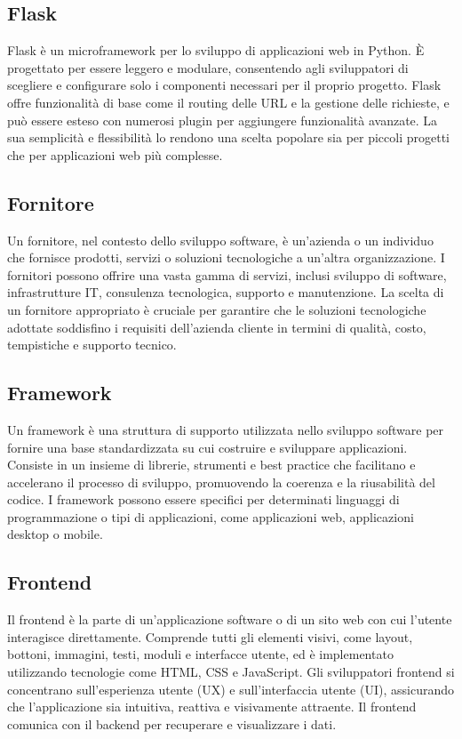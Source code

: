 \vspace{2em}
\subsection*{Flask}
Flask è un microframework per lo sviluppo di applicazioni web in Python. È progettato per essere leggero e modulare, consentendo agli sviluppatori di scegliere e configurare solo i componenti necessari per il proprio progetto. Flask offre funzionalità di base come il routing delle URL e la gestione delle richieste, e può essere esteso con numerosi plugin per aggiungere funzionalità avanzate. La sua semplicità e flessibilità lo rendono una scelta popolare sia per piccoli progetti che per applicazioni web più complesse.

\vspace{2em}
\subsection*{Fornitore}
Un fornitore, nel contesto dello sviluppo software, è un'azienda o un individuo che fornisce prodotti, servizi o soluzioni tecnologiche a un'altra organizzazione. I fornitori possono offrire una vasta gamma di servizi, inclusi sviluppo di software, infrastrutture IT, consulenza tecnologica, supporto e manutenzione. La scelta di un fornitore appropriato è cruciale per garantire che le soluzioni tecnologiche adottate soddisfino i requisiti dell'azienda cliente in termini di qualità, costo, tempistiche e supporto tecnico.

\vspace{2em}
\subsection*{Framework}
Un framework è una struttura di supporto utilizzata nello sviluppo software per fornire una base standardizzata su cui costruire e sviluppare applicazioni. Consiste in un insieme di librerie, strumenti e best practice che facilitano e accelerano il processo di sviluppo, promuovendo la coerenza e la riusabilità del codice. I framework possono essere specifici per determinati linguaggi di programmazione o tipi di applicazioni, come applicazioni web, applicazioni desktop o mobile.

\vspace{2em}
\subsection*{Frontend}
Il frontend è la parte di un'applicazione software o di un sito web con cui l'utente interagisce direttamente. Comprende tutti gli elementi visivi, come layout, bottoni, immagini, testi, moduli e interfacce utente, ed è implementato utilizzando tecnologie come HTML, CSS e JavaScript. Gli sviluppatori frontend si concentrano sull'esperienza utente (UX) e sull'interfaccia utente (UI), assicurando che l'applicazione sia intuitiva, reattiva e visivamente attraente. Il frontend comunica con il backend per recuperare e visualizzare i dati.
